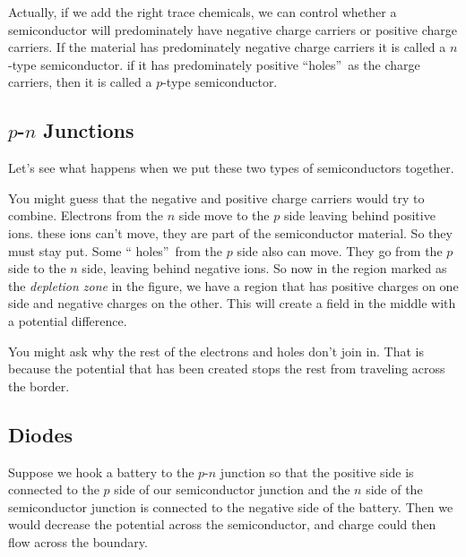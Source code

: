 Actually, if we add the right trace chemicals, we can control whether a
semiconductor will predominately have negative charge carriers or positive
charge carriers. If the material has predominately negative charge carriers
it is called a $n$-type semiconductor. if it has predominately positive
\textquotedblleft holes\textquotedblright\ as the charge carriers, then it
is called a $p$-type semiconductor.

\subsection{$p$-$n$ Junctions}

Let's see what happens when we put these two types of semiconductors
together. 

You might guess that the negative and positive charge carriers would try to
combine. Electrons from the $n$ side move to the $p$ side leaving behind
positive ions. these ions can't move, they are part of the semiconductor
material. So they must stay put. Some \textquotedblleft
holes\textquotedblright\ from the $p$ side also can move. They go from the $%
p $ side to the $n$ side, leaving behind negative ions. So now in the region
marked as the \emph{depletion zone} in the figure, we have a region that has
positive charges on one side and negative charges on the other. This will
create a field in the middle with a potential difference.

You might ask why the rest of the electrons and holes don't join in. That is
because the potential that has been created stops the rest from traveling
across the border.

\subsection{Diodes}

Suppose we hook a battery to the $p$-$n$ junction so that the positive side
is connected to the $p$ side of our semiconductor junction and the $n$ side
of the semiconductor junction is connected to the negative side of the
battery. Then we would decrease the potential across the semiconductor, and
charge could then flow across the boundary.

